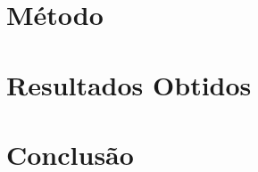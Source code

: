\chapter[Método]{Método}\label{cap:metodo}
\minitoc


\chapter[Resultados Obtidos]{Resultados Obtidos}\label{cap:result}
\minitoc


\chapter[Conclusão]{Conclusão}\label{cap:conclusao}



\postextual
%

%
%
%
\label{ap:apendice1}
%
%
%
%
%


